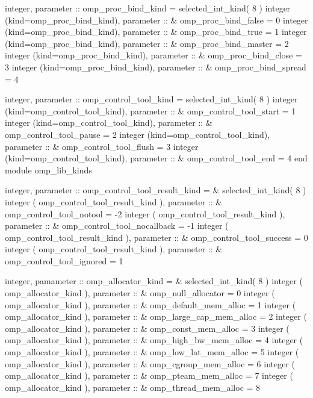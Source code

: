 {\begin{codepar}
        integer, parameter :: omp\_proc\_bind\_kind = selected\_int\_kind( 8 )
        integer (kind=omp\_proc\_bind\_kind), parameter ::
      \&   omp\_proc\_bind\_false = 0
        integer (kind=omp\_proc\_bind\_kind), parameter ::
      \&   omp\_proc\_bind\_true = 1
        integer (kind=omp\_proc\_bind\_kind), parameter ::
      \&   omp\_proc\_bind\_master = 2
        integer (kind=omp\_proc\_bind\_kind), parameter ::
      \&   omp\_proc\_bind\_close = 3
        integer (kind=omp\_proc\_bind\_kind), parameter ::
      \&   omp\_proc\_bind\_spread = 4
\begin{samepage}
        integer, parameter :: omp\_control\_tool\_kind = selected\_int\_kind( 8 )
        integer (kind=omp\_control\_tool\_kind), parameter :: 
      \&   omp\_control\_tool\_start = 1
        integer (kind=omp\_control\_tool\_kind), parameter :: 
      \&   omp\_control\_tool\_pause = 2
        integer (kind=omp\_control\_tool\_kind), parameter :: 
      \&   omp\_control\_tool\_flush = 3
        integer (kind=omp\_control\_tool\_kind), parameter :: 
      \&   omp\_control\_tool\_end = 4
        end module omp\_lib\_kinds
\end{samepage}
\begin{samepage}
        integer, parameter :: omp\_control\_tool\_result\_kind = 
      \&   selected\_int\_kind( 8 )
        integer ( omp\_control\_tool\_result\_kind ), parameter :: 
      \&   omp_control_tool_notool = -2 
        integer ( omp\_control\_tool\_result\_kind ), parameter ::
      \&   omp_control_tool_nocallback = -1
        integer ( omp\_control\_tool\_result\_kind ), parameter ::
      \&   omp_control_tool_success = 0
        integer ( omp\_control\_tool\_result\_kind ), parameter ::
      \&   omp_control_tool_ignored = 1
\end{samepage}
\begin{samepage}
        integer, pamameter :: omp\_allocator\_kind =
      \&  selected\_int\_kind( 8 )
        integer ( omp\_allocator\_kind ), parameter ::  
      \& omp\_null\_allocator = 0
        integer ( omp\_allocator\_kind ), parameter ::
      \& omp\_default\_mem\_alloc = 1
        integer ( omp\_allocator\_kind ), parameter ::
      \& omp\_large\_cap\_mem\_alloc = 2
        integer ( omp\_allocator\_kind ), parameter ::
      \& omp\_const\_mem\_alloc = 3
        integer ( omp\_allocator\_kind ), parameter :: 
      \& omp\_high\_bw\_mem\_alloc = 4
        integer ( omp\_allocator\_kind ), parameter ::
      \& omp\_low\_lat\_mem\_alloc = 5
        integer ( omp\_allocator\_kind ), parameter ::
      \& omp\_cgroup\_mem\_alloc = 6
        integer ( omp\_allocator\_kind ), parameter ::
      \& omp\_pteam\_mem\_alloc = 7
        integer ( omp\_allocator\_kind ), parameter ::
      \& omp\_thread\_mem\_alloc = 8 
\end{samepage}


\end{codepar}}
